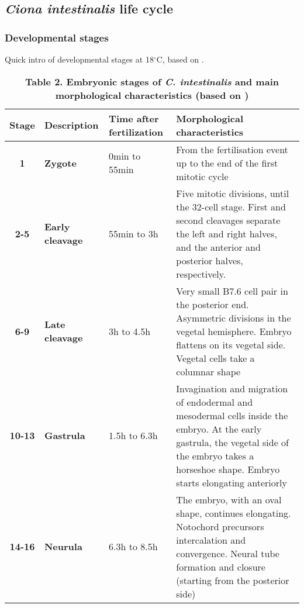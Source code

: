 \subsection{\textit{Ciona intestinalis} life cycle}


\subsubsection{Developmental stages}

Quick intro of developmental stages at 18$^\circ$C, based on \citep{Hotta2007}.

\label{Table_Ciona}
\begin{sidewaystable}
    \centering

\caption*{\textbf{Table 2. Embryonic stages of \textit{C. intestinalis} and main morphological characteristics (based on \citealp{Hotta2007}) }}
\begin{tabular}{|c|p{3cm}|p{3cm}|p{10cm}|}
\hline
\textbf{Stage}&\textbf{Description}&\textbf{Time after fertilization}& \textbf{Morphological characteristics} \\
\hline
\textbf{1}	& \textbf{Zygote}		& 0min to 55min 	&	From the fertilisation event up to the end of the first mitotic cycle \\
%
\textbf{2-5}	& \textbf{Early cleavage}& 55min to 3h	& Five mitotic divisions, until the 32-cell stage. First and second cleavages separate the left and right halves, and the anterior and posterior halves, respectively.  
\\
%
\textbf{6-9}	& \textbf{Late cleavage}& 3h to 4.5h	& Very small B7.6 cell pair in the posterior end. Asymmetric divisions in the vegetal hemisphere. Embryo flattens on its vegetal side. Vegetal cells take a columnar shape\\
%
\textbf{10-13}	& \textbf{Gastrula}	& 1.5h to 6.3h	& Invagination and migration of endodermal and mesodermal cells inside the embryo. At the early gastrula, the vegetal side of the embryo takes a horseshoe shape. Embryo starts elongating anteriorly \\
%
\textbf{14-16}	& \textbf{Neurula}	& 6.3h to 8.5h	& The embryo, with an oval shape, continues elongating. Notochord precursors  intercalation and convergence. Neural tube formation and closure (starting from the posterior side)\\

\end{tabular}
\end{sidewaystable}
